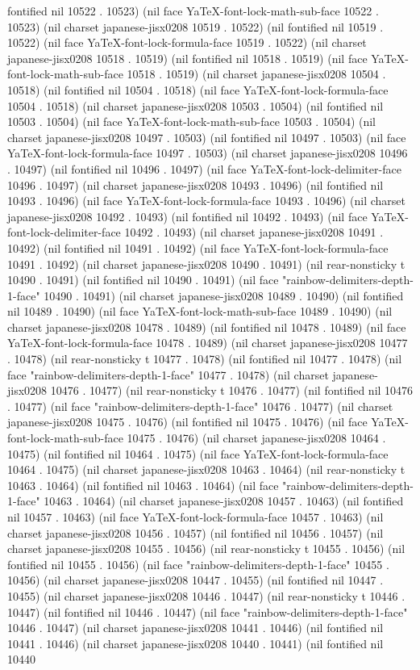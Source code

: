 fontified nil 10522 . 10523) (nil face YaTeX-font-lock-math-sub-face 10522 . 10523) (nil charset japanese-jisx0208 10519 . 10522) (nil fontified nil 10519 . 10522) (nil face YaTeX-font-lock-formula-face 10519 . 10522) (nil charset japanese-jisx0208 10518 . 10519) (nil fontified nil 10518 . 10519) (nil face YaTeX-font-lock-math-sub-face 10518 . 10519) (nil charset japanese-jisx0208 10504 . 10518) (nil fontified nil 10504 . 10518) (nil face YaTeX-font-lock-formula-face 10504 . 10518) (nil charset japanese-jisx0208 10503 . 10504) (nil fontified nil 10503 . 10504) (nil face YaTeX-font-lock-math-sub-face 10503 . 10504) (nil charset japanese-jisx0208 10497 . 10503) (nil fontified nil 10497 . 10503) (nil face YaTeX-font-lock-formula-face 10497 . 10503) (nil charset japanese-jisx0208 10496 . 10497) (nil fontified nil 10496 . 10497) (nil face YaTeX-font-lock-delimiter-face 10496 . 10497) (nil charset japanese-jisx0208 10493 . 10496) (nil fontified nil 10493 . 10496) (nil face YaTeX-font-lock-formula-face 10493 . 10496) (nil charset japanese-jisx0208 10492 . 10493) (nil fontified nil 10492 . 10493) (nil face YaTeX-font-lock-delimiter-face 10492 . 10493) (nil charset japanese-jisx0208 10491 . 10492) (nil fontified nil 10491 . 10492) (nil face YaTeX-font-lock-formula-face 10491 . 10492) (nil charset japanese-jisx0208 10490 . 10491) (nil rear-nonsticky t 10490 . 10491) (nil fontified nil 10490 . 10491) (nil face "rainbow-delimiters-depth-1-face" 10490 . 10491) (nil charset japanese-jisx0208 10489 . 10490) (nil fontified nil 10489 . 10490) (nil face YaTeX-font-lock-math-sub-face 10489 . 10490) (nil charset japanese-jisx0208 10478 . 10489) (nil fontified nil 10478 . 10489) (nil face YaTeX-font-lock-formula-face 10478 . 10489) (nil charset japanese-jisx0208 10477 . 10478) (nil rear-nonsticky t 10477 . 10478) (nil fontified nil 10477 . 10478) (nil face "rainbow-delimiters-depth-1-face" 10477 . 10478) (nil charset japanese-jisx0208 10476 . 10477) (nil rear-nonsticky t 10476 . 10477) (nil fontified nil 10476 . 10477) (nil face "rainbow-delimiters-depth-1-face" 10476 . 10477) (nil charset japanese-jisx0208 10475 . 10476) (nil fontified nil 10475 . 10476) (nil face YaTeX-font-lock-math-sub-face 10475 . 10476) (nil charset japanese-jisx0208 10464 . 10475) (nil fontified nil 10464 . 10475) (nil face YaTeX-font-lock-formula-face 10464 . 10475) (nil charset japanese-jisx0208 10463 . 10464) (nil rear-nonsticky t 10463 . 10464) (nil fontified nil 10463 . 10464) (nil face "rainbow-delimiters-depth-1-face" 10463 . 10464) (nil charset japanese-jisx0208 10457 . 10463) (nil fontified nil 10457 . 10463) (nil face YaTeX-font-lock-formula-face 10457 . 10463) (nil charset japanese-jisx0208 10456 . 10457) (nil fontified nil 10456 . 10457) (nil charset japanese-jisx0208 10455 . 10456) (nil rear-nonsticky t 10455 . 10456) (nil fontified nil 10455 . 10456) (nil face "rainbow-delimiters-depth-1-face" 10455 . 10456) (nil charset japanese-jisx0208 10447 . 10455) (nil fontified nil 10447 . 10455) (nil charset japanese-jisx0208 10446 . 10447) (nil rear-nonsticky t 10446 . 10447) (nil fontified nil 10446 . 10447) (nil face "rainbow-delimiters-depth-1-face" 10446 . 10447) (nil charset japanese-jisx0208 10441 . 10446) (nil fontified nil 10441 . 10446) (nil charset japanese-jisx0208 10440 . 10441) (nil fontified nil 10440 